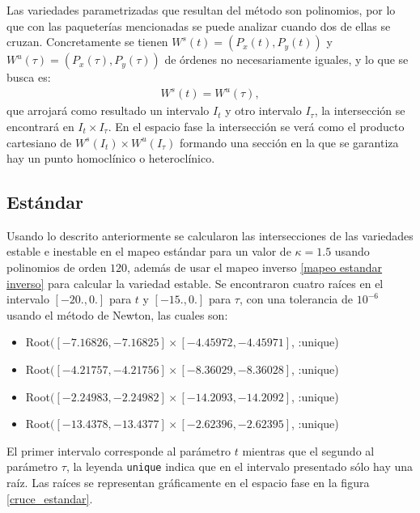 Las variedades parametrizadas que resultan del método son polinomios, por lo que con las paqueterías  mencionadas se puede analizar cuando dos de ellas se cruzan. Concretamente se tienen  $W^{s}(t)=(P_{x}(t),P_{y}(t))$ y $W^{u}(\tau)=(P_{x}(\tau),P_{y}(\tau))$ de órdenes no necesariamente iguales, y lo que se busca es:
\begin{eqnarray}
W^{s}(t)=W^{u}(\tau),
\end{eqnarray}
que arrojará como resultado un intervalo $I_{t}$ y otro intervalo $I_{\tau}$, la intersección se encontrará en $I_{t}\times I_{\tau}$. En el espacio fase la intersección se verá como el producto cartesiano de $W^{s}(I_{t})\times W^{u}(I_{\tau})$ formando una sección en la que se garantiza hay un punto homoclínico o heteroclínico. 


\subsection{Estándar}
Usando lo descrito anteriormente se calcularon las intersecciones de las variedades estable e inestable en el mapeo estándar para un valor de $\kappa=1.5$ usando polinomios de orden $120$, además de usar el mapeo inverso \eqref{mapeo estandar inverso} para calcular la variedad estable. Se encontraron cuatro raíces en el intervalo $[-20.,0.]$ para $t$  y $[-15.,0.]$ para $\tau$, con una tolerancia de $10^{-6}$ usando el método de Newton, las cuales son:
\begin{itemize}
\item Root$([-7.16826, -7.16825] \times [-4.45972, -4.45971]$, :unique)
\item Root$([-4.21757, -4.21756] \times [-8.36029, -8.36028]$, :unique)
\item Root$([-2.24983, -2.24982] \times [-14.2093, -14.2092]$, :unique)
\item Root$([-13.4378, -13.4377] \times [-2.62396, -2.62395]$, :unique)
\end{itemize}
El primer intervalo corresponde al parámetro $t$ mientras que el segundo al parámetro $\tau$, la leyenda \texttt{unique} indica que en el intervalo presentado sólo hay una raíz. Las raíces se representan gráficamente en el espacio fase en la figura \ref{cruce_estandar}. 

